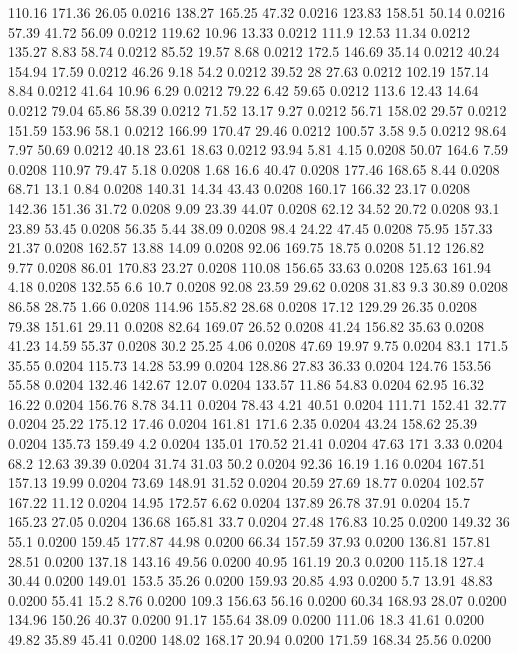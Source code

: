 110.16	171.36	26.05	0.0216
138.27	165.25	47.32	0.0216
123.83	158.51	50.14	0.0216
57.39	41.72	56.09	0.0212
119.62	10.96	13.33	0.0212
111.9	12.53	11.34	0.0212
135.27	8.83	58.74	0.0212
85.52	19.57	8.68	0.0212
172.5	146.69	35.14	0.0212
40.24	154.94	17.59	0.0212
46.26	9.18	54.2	0.0212
39.52	28	27.63	0.0212
102.19	157.14	8.84	0.0212
41.64	10.96	6.29	0.0212
79.22	6.42	59.65	0.0212
113.6	12.43	14.64	0.0212
79.04	65.86	58.39	0.0212
71.52	13.17	9.27	0.0212
56.71	158.02	29.57	0.0212
151.59	153.96	58.1	0.0212
166.99	170.47	29.46	0.0212
100.57	3.58	9.5	0.0212
98.64	7.97	50.69	0.0212
40.18	23.61	18.63	0.0212
93.94	5.81	4.15	0.0208
50.07	164.6	7.59	0.0208
110.97	79.47	5.18	0.0208
1.68	16.6	40.47	0.0208
177.46	168.65	8.44	0.0208
68.71	13.1	0.84	0.0208
140.31	14.34	43.43	0.0208
160.17	166.32	23.17	0.0208
142.36	151.36	31.72	0.0208
9.09	23.39	44.07	0.0208
62.12	34.52	20.72	0.0208
93.1	23.89	53.45	0.0208
56.35	5.44	38.09	0.0208
98.4	24.22	47.45	0.0208
75.95	157.33	21.37	0.0208
162.57	13.88	14.09	0.0208
92.06	169.75	18.75	0.0208
51.12	126.82	9.77	0.0208
86.01	170.83	23.27	0.0208
110.08	156.65	33.63	0.0208
125.63	161.94	4.18	0.0208
132.55	6.6	10.7	0.0208
92.08	23.59	29.62	0.0208
31.83	9.3	30.89	0.0208
86.58	28.75	1.66	0.0208
114.96	155.82	28.68	0.0208
17.12	129.29	26.35	0.0208
79.38	151.61	29.11	0.0208
82.64	169.07	26.52	0.0208
41.24	156.82	35.63	0.0208
41.23	14.59	55.37	0.0208
30.2	25.25	4.06	0.0208
47.69	19.97	9.75	0.0204
83.1	171.5	35.55	0.0204
115.73	14.28	53.99	0.0204
128.86	27.83	36.33	0.0204
124.76	153.56	55.58	0.0204
132.46	142.67	12.07	0.0204
133.57	11.86	54.83	0.0204
62.95	16.32	16.22	0.0204
156.76	8.78	34.11	0.0204
78.43	4.21	40.51	0.0204
111.71	152.41	32.77	0.0204
25.22	175.12	17.46	0.0204
161.81	171.6	2.35	0.0204
43.24	158.62	25.39	0.0204
135.73	159.49	4.2	0.0204
135.01	170.52	21.41	0.0204
47.63	171	3.33	0.0204
68.2	12.63	39.39	0.0204
31.74	31.03	50.2	0.0204
92.36	16.19	1.16	0.0204
167.51	157.13	19.99	0.0204
73.69	148.91	31.52	0.0204
20.59	27.69	18.77	0.0204
102.57	167.22	11.12	0.0204
14.95	172.57	6.62	0.0204
137.89	26.78	37.91	0.0204
15.7	165.23	27.05	0.0204
136.68	165.81	33.7	0.0204
27.48	176.83	10.25	0.0200
149.32	36	55.1	0.0200
159.45	177.87	44.98	0.0200
66.34	157.59	37.93	0.0200
136.81	157.81	28.51	0.0200
137.18	143.16	49.56	0.0200
40.95	161.19	20.3	0.0200
115.18	127.4	30.44	0.0200
149.01	153.5	35.26	0.0200
159.93	20.85	4.93	0.0200
5.7	13.91	48.83	0.0200
55.41	15.2	8.76	0.0200
109.3	156.63	56.16	0.0200
60.34	168.93	28.07	0.0200
134.96	150.26	40.37	0.0200
91.17	155.64	38.09	0.0200
111.06	18.3	41.61	0.0200
49.82	35.89	45.41	0.0200
148.02	168.17	20.94	0.0200
171.59	168.34	25.56	0.0200
